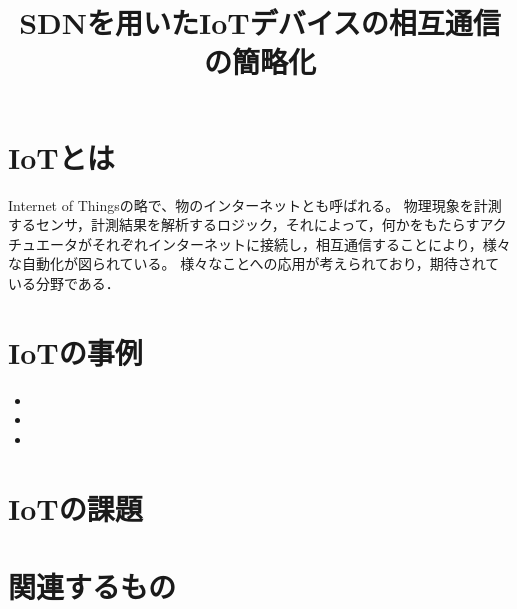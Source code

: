 \documentclass{jsarticle}
\begin{document}
\title{\vspace{-5cm}SDNを用いたIoTデバイスの相互通信の簡略化\vspace{-1em}}
\author{\vspace{-1em}}
\maketitle
\vspace{-1em}
\section{IoTとは}
Internet of Thingsの略で、物のインターネットとも呼ばれる。
物理現象を計測するセンサ，計測結果を解析するロジック，それによって，何かをもたらすアクチュエータがそれぞれインターネットに接続し，相互通信することにより，様々な自動化が図られている。
様々なことへの応用が考えられており，期待されている分野である．
\section{IoTの事例}
\begin{itemize}
	\item 
	\item 
	\item
\end{itemize}
\section{IoTの課題}

\section{関連するもの}
\end{document}
